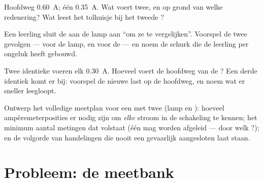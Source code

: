 \begin{exercise}[$\star\star$]\label{exo:g8:intensity-ammeter:9}
Hoofdweg \qty{0.60}{A};  één \qty{0.35}{A}. Wat voert
 twee, en op grond van welke redenering? Wat leest het
tolhuisje bij het tweede ?
\end{exercise}

\begin{exercise}[$\star\star$]\label{exo:g8:intensity-ammeter:10}
Een leerling sluit de  \emph{} aan de
lamp aan ``om ze te vergelijken''. Voorspel de twee gevolgen --- voor
de lamp, en voor de  --- en noem de schurk die de leerling per
ongeluk heeft gebouwd.
\end{exercise}

\begin{exercise}[$\star\star$]\label{exo:g8:intensity-ammeter:11}
Twee identieke   voeren elk
\qty{0.30}{A}. Hoeveel voert de hoofdweg van de
? Een derde identiek  komt er
 bij: voorspel de nieuwe last op de hoofdweg, en noem
wat er sneller leegloopt.
\end{exercise}

\begin{exercise}[$\star\star\star$]\label{exo:g8:intensity-ammeter:12}
Ontwerp het volledige meetplan voor een  met
twee  (lamp en ): hoeveel
ampèremeterposities er nodig zijn om \emph{elke} stroom in de
schakeling te kennen; het minimum aantal metingen dat volstaat (één
mag worden afgeleid --- door welk ?); en de volgorde van
handelingen die nooit een  gevaarlijk aangesloten laat staan.
\end{exercise}

\section{Probleem: de meetbank}

